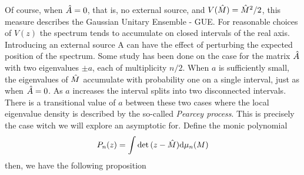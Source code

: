 Of course,  when $\hat A = 0$, that is, no external source, and $V(\hat M) = \hat M^2/2$, this measure describes the Gaussian Unitary Ensemble - GUE. For reasonable choices of $V(z)$ the spectrum tends to accumulate on closed intervals of the real axis. Introducing an external source A can have the effect of perturbing the expected position of the spectrum. Some study has been done on the case for the matrix $\hat A$ with two eigenvalues $\pm a$, each of multiplicity $n/2$. When $a$ is sufficiently small, the eigenvalues of $\hat M$ accumulate with probability one on a single interval, just as when $\hat A = 0$. As $a$ increases the interval splits into two disconnected intervals. There is a transitional value of $a$ between these two cases where the local eigenvalue density is described by the so-called \textit{Pearcey process}. This is precisely the case witch we will explore an asymptotic for. Define the monic polynomial
\begin{equation}
	P_n(z) = \int \det{(z - \hat M)} \mathrm{d} \mu_n(M)	
\end{equation}
then, we have the following proposition
